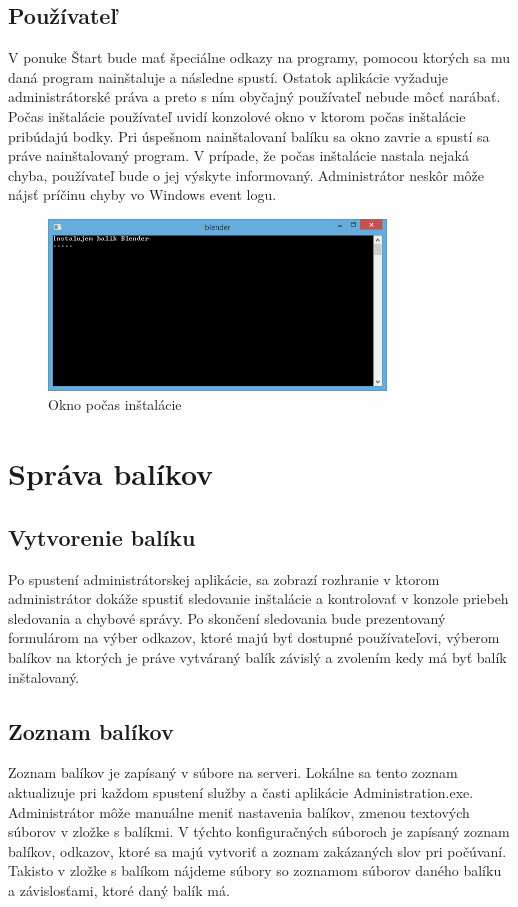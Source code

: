 \subsection{Používateľ}
V ponuke Štart bude mať špeciálne odkazy na programy, pomocou ktorých sa mu daná program nainštaluje a následne spustí. Ostatok aplikácie vyžaduje administrátorské práva a preto s ním obyčajný používateľ nebude môcť narábať. Počas inštalácie používateľ uvidí konzolové okno v ktorom počas inštalácie pribúdajú bodky. Pri úspešnom nainštalovaní balíku sa okno zavrie a spustí sa práve nainštalovaný program. V prípade, že počas inštalácie nastala nejaká chyba, používateľ bude o jej výskyte informovaný. Administrátor neskôr môže nájsť príčinu chyby vo Windows event logu.
\begin{figure}[h]
    \centering
    \includegraphics[width=0.8\textwidth]{installbar}
    \caption{Okno počas inštalácie}
    \label{fig:installbar}
\end{figure}

\section{Správa balíkov}
\subsection{Vytvorenie balíku}
Po spustení administrátorskej aplikácie, sa zobrazí rozhranie v ktorom administrátor dokáže spustiť sledovanie inštalácie a kontrolovať v konzole priebeh sledovania a chybové správy. Po skončení sledovania bude prezentovaný formulárom na výber odkazov, ktoré majú byť dostupné používateľovi, výberom balíkov na ktorých je práve vytváraný balík závislý a zvolením kedy má byť balík inštalovaný.

\subsection{Zoznam balíkov}
Zoznam balíkov je zapísaný v súbore na serveri. Lokálne sa tento zoznam aktualizuje pri každom spustení služby a časti aplikácie Administration.exe. Administrátor môže manuálne meniť nastavenia balíkov, zmenou textových súborov v zložke s balíkmi. V týchto konfiguračných súboroch je zapísaný zoznam balíkov, odkazov, ktoré sa majú vytvoriť a zoznam zakázaných slov pri počúvaní. Takisto v zložke s balíkom nájdeme súbory so zoznamom súborov daného balíku a závislosťami, ktoré daný balík má.

